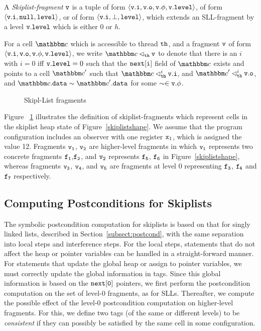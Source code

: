 \begin{definition}
\label{def:skiplist-fragment}
A {\em Skiplist-fragment} $\mathtt{v}$
is a tuple of form
$\left\langle\mathtt{v}.\mathtt{i},\mathtt{v}.\mathtt{o},\mathtt{v}.\phi,\mathtt{v}.\mathtt{level}\right\rangle$, of form
$\left\langle\mathtt{v}.\mathtt{i},{\tt null},\mathtt{level}\right\rangle$, or of form
$\left\langle\mathtt{v}.\mathtt{i},\bot,\mathtt{level}\right\rangle$,
which extends an SLL-fragment by a level $\mathtt{v}.\mathtt{level}$ which is either $0$ or $h$.
\end{definition}
For a cell $\cell$ which is accessible to thread ${\tt th}$, and a fragment
$\mathtt{v}$ of form $\left\langle\mathtt{v}.\mathtt{i},\mathtt{v}.\mathtt{o},\mathtt{v}.\phi,\mathtt{v}.\mathtt{level}\right\rangle$,
we write $\cell \satfrag{\thread}\frag$ to denote that
there is an $i$ with $i= 0$ iff $\mathtt{v}.\mathtt{level} = 0$ such that
the ${\tt next[i]}$ field of $\cell$ exists and points to a cell $\cell'$ such that
$\cell \satslfrag{\thread}{i} \inat{\frag}$, and
$\cell' \satslfrag{\thread}{i} \outat{\frag}$, and
$\cell.\mathtt{data} \sim \cell'.\mathtt{data}$ for some $\sim \in \mathtt{v}.\phi$.
 \begin{figure}  
  
 \caption{Skipl-List fragments}
 \label{skiplistabs}
\end{figure}
Figure ~\ref{skiplistabs} illustrates the definition of skiplist-fragments
which represent cells in the skiplist heap state of Figure~\ref{skiplistshape}.
We assume that the program configuration includes an observer with one
register $\mathtt{x}_1$, which is assigned the value 12.
Fragments $\tt v_1$, $\tt v_2$ are higher-level
fragments in which $\tt v_1$ represents two concrete fragments $\tt f_1$,$\tt f_2$, and $\tt v_2$ represents $\tt f_5$, $\tt f_6$ in Figure~\ref{skiplistshape}, whereas fragments $\tt v_3$, $\tt v_4$, and $\tt v_5$ are
fragments at level $0$ representing $\tt f_3$, $\tt f_4$ and $\tt f_7$ respectively.
 
\subsection{Computing Postconditions for Skiplists}
\label{subsect:postcond-skiplists}
The symbolic postcondition computation for skiplists is based on that for
singly linked lists, described in Section~\ref{subsect:postcond}, with the
same separation into local steps and interference steps.
For the local steps, statements that do not affect the heap or pointer
variables can be handled in a straight-forward manner.
For statements that update the global heap or assign to pointer variables,
we must correctly update the global information in tags.
Since this global information is based on the $\tt next[0]$ pointers,
we first perform the postcondition computation on the set of
level-0 fragments, as for SLLs. Thereafter, we compute the possible
effect of the level-0 postcondition computation  on higher-level fragments.
For this, we define two tags (of the same or different levels)
to be {\em consistent} if they can possibly be satisfied by the same
cell in some configuration.

